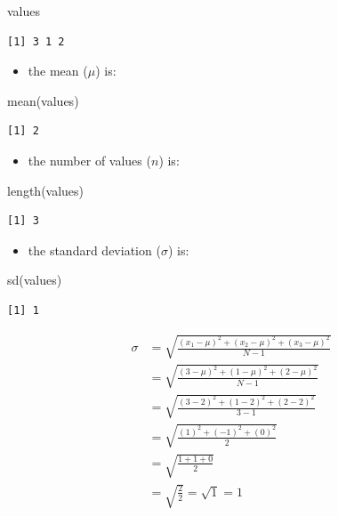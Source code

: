 \documentclass[
  letterpaper,
  DIV=11]{scrartcl}
\newenvironment{Shaded}{\begin{snugshade}}{\end{snugshade}}
\newcommand{\FunctionTok}[1]{\textcolor[rgb]{0.28,0.35,0.67}{#1}}
\newcommand{\NormalTok}[1]{\textcolor[rgb]{0.00,0.23,0.31}{#1}}
\providecommand{\tightlist}{%
  \setlength{\itemsep}{0pt}\setlength{\parskip}{0pt}}\usepackage{longtable,booktabs,array}
\begin{document}
\begin{Shaded}
\begin{Highlighting}[]
\NormalTok{values}
\end{Highlighting}
\end{Shaded}

\begin{verbatim}
[1] 3 1 2
\end{verbatim}

\begin{itemize}
\tightlist
\item
  the mean (\(\mu\)) is:
\end{itemize}

\begin{Shaded}
\begin{Highlighting}[]
\FunctionTok{mean}\NormalTok{(values)}
\end{Highlighting}
\end{Shaded}

\begin{verbatim}
[1] 2
\end{verbatim}

\begin{itemize}
\tightlist
\item
  the number of values (\(n\)) is:
\end{itemize}

\begin{Shaded}
\begin{Highlighting}[]
\FunctionTok{length}\NormalTok{(values)}
\end{Highlighting}
\end{Shaded}

\begin{verbatim}
[1] 3
\end{verbatim}

\begin{itemize}
\tightlist
\item
  the standard deviation (\(\sigma\)) is:
\end{itemize}

\begin{Shaded}
\begin{Highlighting}[]
\FunctionTok{sd}\NormalTok{(values)}
\end{Highlighting}
\end{Shaded}

\begin{verbatim}
[1] 1
\end{verbatim}

\begin{align}

\sigma & = \sqrt{\frac{(x_1-\mu)^2 + (x_2-\mu)^2 + (x_3-\mu)^2}{N-1}}
\\
& = \sqrt{\frac{(3-\mu)^2 + (1-\mu)^2 + (2-\mu)^2}{N-1}}
\\
& = \sqrt{\frac{(3-2)^2 + (1-2)^2 + (2-2)^2}{3-1}}
\\
& = \sqrt{\frac{(1)^2 + (-1)^2 + (0)^2}{2}}
\\
& = \sqrt{\frac{1 + 1 + 0}{2}}
\\
& = \sqrt{\frac{2}{2}} = \sqrt{1} = 1

\end{align}
\end{document}
